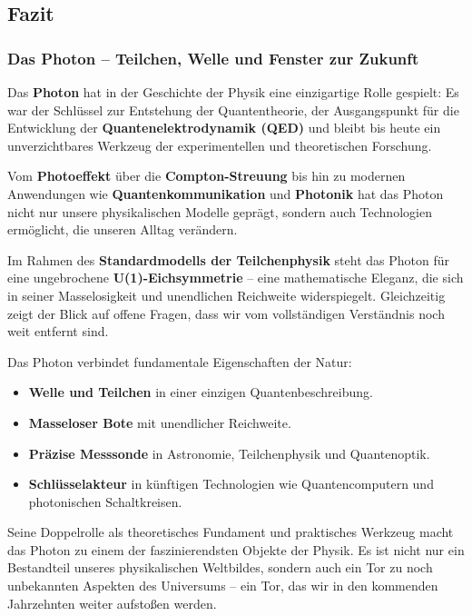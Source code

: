 \subsection{Fazit}
\subsubsection*{Das Photon – Teilchen, Welle und Fenster zur Zukunft}
Das \textbf{Photon} hat in der Geschichte der Physik eine einzigartige Rolle gespielt:  
Es war der Schlüssel zur Entstehung der Quantentheorie, der Ausgangspunkt für die Entwicklung der \textbf{Quantenelektrodynamik (QED)} und bleibt bis heute ein unverzichtbares Werkzeug der experimentellen und theoretischen Forschung.

Vom \textbf{Photoeffekt} über die \textbf{Compton-Streuung} bis hin zu modernen Anwendungen wie \textbf{Quantenkommunikation} und \textbf{Photonik} hat das Photon nicht nur unsere physikalischen Modelle geprägt, sondern auch Technologien ermöglicht, die unseren Alltag verändern.

Im Rahmen des \textbf{Standardmodells der Teilchenphysik} steht das Photon für eine ungebrochene \textbf{U(1)-Eichsymmetrie} – eine mathematische Eleganz, die sich in seiner Masselosigkeit und unendlichen Reichweite widerspiegelt.  
Gleichzeitig zeigt der Blick auf offene Fragen, dass wir vom vollständigen Verständnis noch weit entfernt sind.

Das Photon verbindet fundamentale Eigenschaften der Natur:
\begin{itemize}
	\item \textbf{Welle und Teilchen} in einer einzigen Quantenbeschreibung.
	\item \textbf{Masseloser Bote} mit unendlicher Reichweite.
	\item \textbf{Präzise Messsonde} in Astronomie, Teilchenphysik und Quantenoptik.
	\item \textbf{Schlüsselakteur} in künftigen Technologien wie Quantencomputern und photonischen Schaltkreisen.
\end{itemize}

Seine Doppelrolle als theoretisches Fundament und praktisches Werkzeug macht das Photon zu einem der faszinierendsten Objekte der Physik.  
Es ist nicht nur ein Bestandteil unseres physikalischen Weltbildes, sondern auch ein Tor zu noch unbekannten Aspekten des Universums – ein Tor, das wir in den kommenden Jahrzehnten weiter aufstoßen werden.



